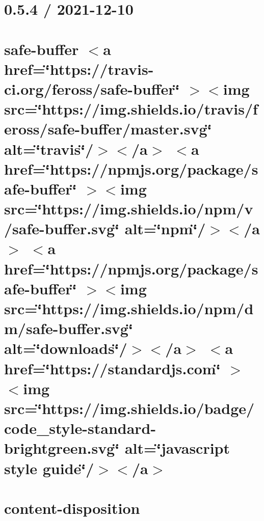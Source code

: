 \documentclass[twoside]{book}
\newcommand{\+}{\discretionary{\mbox{\scriptsize$\hookleftarrow$}}{}{}}
\begin{document}
\chapter{0.5.4 / 2021-\/12-\/10}
\label{md__c___users_vaishnavi_jadhav__desktop__developer_code_mean_stack_example_client_node_modules_cbcc7383ea81502cf494915404c68edcc}

\chapter{safe-\/buffer \texorpdfstring{$<$}{<}a href=\char`\"{}https\+://travis-\/ci.\+org/feross/safe-\/buffer\char`\"{} \texorpdfstring{$>$}{>}\texorpdfstring{$<$}{<}img src=\char`\"{}https\+://img.\+shields.\+io/travis/feross/safe-\/buffer/master.\+svg\char`\"{} alt=\char`\"{}travis\char`\"{}/\texorpdfstring{$>$}{>}\texorpdfstring{$<$}{<}/a\texorpdfstring{$>$}{>} \texorpdfstring{$<$}{<}a href=\char`\"{}https\+://npmjs.\+org/package/safe-\/buffer\char`\"{} \texorpdfstring{$>$}{>}\texorpdfstring{$<$}{<}img src=\char`\"{}https\+://img.\+shields.\+io/npm/v/safe-\/buffer.\+svg\char`\"{} alt=\char`\"{}npm\char`\"{}/\texorpdfstring{$>$}{>}\texorpdfstring{$<$}{<}/a\texorpdfstring{$>$}{>} \texorpdfstring{$<$}{<}a href=\char`\"{}https\+://npmjs.\+org/package/safe-\/buffer\char`\"{} \texorpdfstring{$>$}{>}\texorpdfstring{$<$}{<}img src=\char`\"{}https\+://img.\+shields.\+io/npm/dm/safe-\/buffer.\+svg\char`\"{} alt=\char`\"{}downloads\char`\"{}/\texorpdfstring{$>$}{>}\texorpdfstring{$<$}{<}/a\texorpdfstring{$>$}{>} \texorpdfstring{$<$}{<}a href=\char`\"{}https\+://standardjs.\+com\char`\"{} \texorpdfstring{$>$}{>}\texorpdfstring{$<$}{<}img src=\char`\"{}https\+://img.\+shields.\+io/badge/code\+\_\+style-\/standard-\/brightgreen.\+svg\char`\"{} alt=\char`\"{}javascript style guide\char`\"{}/\texorpdfstring{$>$}{>}\texorpdfstring{$<$}{<}/a\texorpdfstring{$>$}{>}}
\label{md__c___users_vaishnavi_jadhav__desktop__developer_code_mean_stack_example_client_node_modules_c70f9f79b43324d31cfa323a7ef6dd23a}

\chapter{content-\/disposition}
\label{md__c___users_vaishnavi_jadhav__desktop__developer_code_mean_stack_example_client_node_modules_content_disposition__r_e_a_d_m_e}

\end{document}
